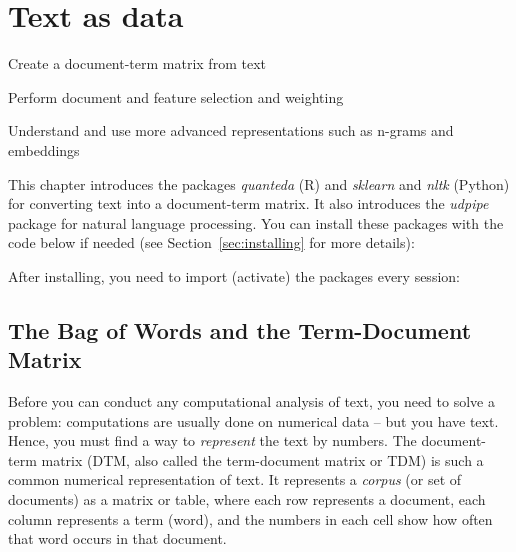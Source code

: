 \chapter{Text as data}
\label{chap:dtm}

\begin{abstract}{Abstract}
  This chapter shows how you can analyze texts that are stored as a data frame column or variable using functions from the package \emph{quanteda} in R and the package \emph{sklearn} in Python and R.
  Please see Chapter~\ref{chap:protext} for more information on reading and cleaning text.

\end{abstract}


\begin{objectives}
\item Create a document-term matrix from text
\item Perform  document and feature selection and weighting
\item Understand and use more advanced representations such as n-grams and embeddings
\end{objectives}


\newpage
\begin{feature}
  This chapter introduces the packages \emph{quanteda} (R) and \emph{sklearn} and \emph{nltk} (Python) for converting text into a document-term matrix. It also introduces the \emph{udpipe} package for natural language processing.
You can install these packages with the code below if needed  (see Section~\ref{sec:installing} for more details):


\noindent After installing, you need to import (activate) the packages every session:


\end{feature}

%
\section{The Bag of Words and the Term-Document Matrix}
\label{sec:dtm}

Before you can conduct any computational analysis of text, you need to solve a problem: computations are usually done on numerical data -- but you have text. Hence, you must find a way to \emph{represent} the text by numbers.
The document-term matrix (DTM, also called the term-document matrix or TDM) is such a common numerical representation of text.
It represents a \emph{corpus} (or set of documents) as a matrix or table, where each row represents a document, each column represents a term (word),
and the numbers in each cell show how often that word occurs in that document.

